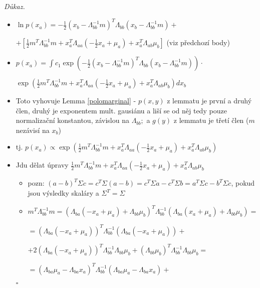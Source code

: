 \documentclass{article}
\newenvironment{pitemize}{
\begin{itemize}
  \setlength{\itemsep}{5pt}
  \setlength{\parskip}{0pt}
  \setlength{\parsep}{0pt}
}{\end{itemize}}
\newenvironment{pproof}{
\noindent\emph{Důkaz.}
\begin{pitemize}
}{\hfill$\square$\end{pitemize}}
\theoremstyle{definition}
\begin{document}
\begin{pproof}
\item $\ln p(x_a)=-\frac{1}{2}\left(x_b-\Lambda_{bb}^{-1}m\right)^T
\Lambda_{bb}\left(x_b-\Lambda_{bb}^{-1}m
\right)+$

$+\left[\frac{1}{2}m^T\Lambda_{bb}^{-1} m+
x_a^T\Lambda_{aa}\left(-\frac{1}{2}x_a+\mu_a\right)+
x_a^T\Lambda_{ab}\mu_b\right]$
(viz předchozí body)

\item $p\left(x_a\right)=\int  c_1 \exp\left(-\frac{1}{2}\left(x_b-\Lambda_{bb}^{-1}m\right)^T
\Lambda_{bb}\left(x_b-\Lambda_{bb}^{-1}m
\right)\right) \cdot$

$ \exp\left(\frac{1}{2}m^T\Lambda_{bb}^{-1} m+
x_a^T\Lambda_{aa}\left(-\frac{1}{2}x_a+\mu_a\right)+
x_a^T\Lambda_{ab}\mu_b\right)  d x_b$

\item Toto vyhovuje Lemma \ref{polomarginal} - 
$p(x,y)$ z lemmatu je první a druhý člen, druhý je exponentem mult. gausiánu a liší se od něj tedy
pouze normalizační konstantou, závislou na $\Lambda_{bb};$ a $g(y)$ z lemmatu je třetí člen ($m$ nezávisí na $x_b$)
\item tj. $p(x_a)\propto \exp\left(\frac{1}{2}m^T\Lambda_{bb}^{-1} m+
x_a^T\Lambda_{aa}\left(-\frac{1}{2}x_a+\mu_a\right)+
x_a^T\Lambda_{ab}\mu_b\right)$

\item Jdu dělat úpravy $\frac{1}{2}m^T\Lambda_{bb}^{-1} m+
x_a^T\Lambda_{aa}\left(-\frac{1}{2}x_a+\mu_a\right)+
x_a^T\Lambda_{ab}\mu_b$
\begin {itemize}
\item pozn: $(a-b)^T\Sigma c=c^T\Sigma(a-b)=c^T\Sigma a-c^T\Sigma b=a^T\Sigma c-b^T\Sigma c$, pokud jsou výsledky skaláry a $\Sigma^T=\Sigma$
\item $m^T\Lambda_{bb}^{-1} m=\left(\Lambda_{ba}\left(-x_a+\mu_a\right)+\Lambda_{bb}\mu_b\right)^T
\Lambda_{bb}^{-1}\left(\Lambda_{ba}\left(
x_a+\mu_a\right)+\Lambda_{bb}\mu_b\right)=$

$=\left(\Lambda_{ba}\left(-x_a+\mu_a\right)\right)^T\Lambda_{bb}^{-1}
\left(\Lambda_{ba}\left(-x_a+\mu_a\right)\right)+$

$+2\left(\Lambda_{ba}\left(-x_a+\mu_a\right)\right)^T\Lambda_{bb}^{-1}
\Lambda_{bb}\mu_b+
\left(\Lambda_{bb}\mu_b\right)^T
\Lambda_{bb}^{-1}
\Lambda_{bb}\mu_b=$

$=\left(\Lambda_{ba}\mu_a-\Lambda_{ba}x_a\right)
^T\Lambda_{bb}^{-1}
\left(\Lambda_{ba}\mu_a-\Lambda_{ba}x_a\right)+$

\nopagebreak


\end{itemize}
\end{pproof}
\end{document}
